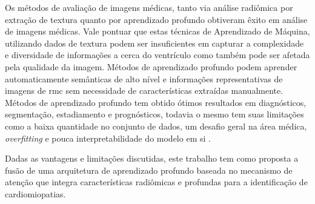Os métodos de avaliação de imagens médicas, tanto via análise radiômica por extração de textura quanto por aprendizado profundo obtiveram êxito em análise de imagens médicas. Vale pontuar que estas técnicas de Aprendizado de Máquina, utilizando dados de textura podem ser insuficientes em capturar a complexidade e diversidade de informações a cerca do ventrículo como também pode ser afetada pela qualidade da imagem. Métodos de aprendizado profundo podem aprender automaticamente semânticas de alto nível e informações representativas de imagens de \gls{rmc} sem necessidade de características extraídas manualmente.
Métodos de aprendizado profundo tem obtido ótimos resultados em diagnósticos, segmentação, estadiamento e prognósticos, todavia o mesmo tem suas limitações como a baixa quantidade no conjunto de dados, um desafio geral na área médica, \textit{overfitting} e pouca interpretabilidade do modelo em si \cite{pontoneClinicalApplicationsCardiac2022}.

Dadas as vantagens e limitações discutidas, este trabalho tem como proposta a fusão de uma arquitetura de aprendizado profundo baseada no mecanismo de atenção que integra características radiômicas e profundas para a identificação de cardiomiopatias. 
